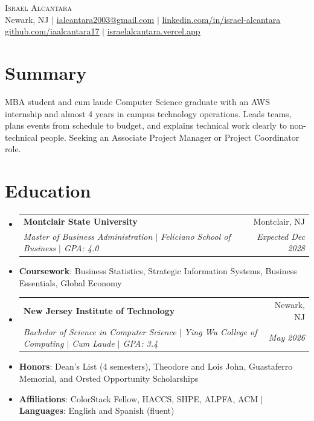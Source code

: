 \documentclass[letterpaper,11pt]{article}
\makeatletter
\newcommand{\resumeFirstLine}[1]{\vspace{3pt}\item[]\small{#1}}
\newcommand{\resumeLine}[1]{\vspace{-1pt}\item[]\small{#1}}
\newcommand{\resumeSchoolGap}{\vspace{3pt}}
\newcommand{\resumeSubheading}[4]{
  \vspace{-2pt}\item
    \begin{tabular*}{0.97\textwidth}[t]{l@{\extracolsep{\fill}}r}
      \textbf{#1} & #2 \\
      \textit{\small#3} & \textit{\small #4} \\
    \end{tabular*}\vspace{-7pt}
}
\newcommand{\resumeSubHeadingListStart}{\begin{itemize}[leftmargin=0.15in, label={}, itemsep=1pt, parsep=0pt, topsep=2pt]}
\newcommand{\resumeSubHeadingListEnd}{\end{itemize}}
\makeatother
\begin{document}
\begin{center}
    {\Huge \scshape Israel Alcantara} \\ \vspace{1pt}
    \small Newark, NJ $|$ \href{mailto:ialcantara2003@gmail.com}{\underline{ialcantara2003@gmail.com}} $|$
    \href{https://www.linkedin.com/in/israel-alcantara}{\underline{linkedin.com/in/israel-alcantara}} \\
    \href{https://github.com/iaalcantara17}{\underline{github.com/iaalcantara17}} $|$
    \href{https://israelalcantara.vercel.app}{\underline{israelalcantara.vercel.app}}
\end{center}
\vspace{-8pt}
\section{Summary}
\begin{itemize}[leftmargin=0.15in, label={}, topsep=0pt, partopsep=0pt]
    \small{\item{MBA student and cum laude Computer Science graduate with an AWS internship and almost 4 years in campus technology operations. Leads teams, plans events from schedule to budget, and explains technical work clearly to non-technical people. Seeking an Associate Project Manager or Project Coordinator role.}}
\end{itemize}

\section{Education}
  \resumeSubHeadingListStart
    \resumeSubheading
      {Montclair State University}{Montclair, NJ}
      {Master of Business Administration $|$ Feliciano School of Business $|$ GPA: 4.0}{Expected Dec 2028}
      \resumeFirstLine{\textbf{Coursework}: Business Statistics, Strategic Information Systems, Business Essentials, Global Economy}
    \resumeSchoolGap
    \resumeSubheading
      {New Jersey Institute of Technology}{Newark, NJ}
      {Bachelor of Science in Computer Science $|$ Ying Wu College of Computing $|$ Cum Laude $|$ GPA: 3.4}{May 2026}
      \resumeFirstLine{\textbf{Honors}: Dean's List (4 semesters), Theodore and Lois John, Guastaferro Memorial, and Orsted Opportunity Scholarships}
      \resumeLine{\textbf{Affiliations}: ColorStack Fellow, HACCS, SHPE, ALPFA, ACM $|$ \textbf{Languages}: English and Spanish (fluent)}
  \resumeSubHeadingListEnd
\end{document}

